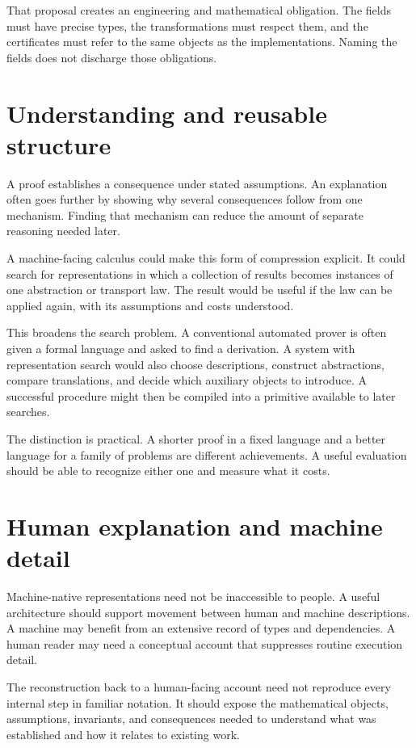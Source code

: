 \documentclass[11pt,oneside,openany]{book}
\begin{document}
That proposal creates an engineering and mathematical obligation. The fields must have precise types, the transformations must respect them, and the certificates must refer to the same objects as the implementations. Naming the fields does not discharge those obligations.

\section{Understanding and reusable structure}
A proof establishes a consequence under stated assumptions. An explanation often goes further by showing why several consequences follow from one mechanism. Finding that mechanism can reduce the amount of separate reasoning needed later.

A machine-facing calculus could make this form of compression explicit. It could search for representations in which a collection of results becomes instances of one abstraction or transport law. The result would be useful if the law can be applied again, with its assumptions and costs understood.

This broadens the search problem. A conventional automated prover is often given a formal language and asked to find a derivation. A system with representation search would also choose descriptions, construct abstractions, compare translations, and decide which auxiliary objects to introduce. A successful procedure might then be compiled into a primitive available to later searches.

The distinction is practical. A shorter proof in a fixed language and a better language for a family of problems are different achievements. A useful evaluation should be able to recognize either one and measure what it costs.

\section{Human explanation and machine detail}
Machine-native representations need not be inaccessible to people. A useful architecture should support movement between human and machine descriptions. A machine may benefit from an extensive record of types and dependencies. A human reader may need a conceptual account that suppresses routine execution detail.

The reconstruction back to a human-facing account need not reproduce every internal step in familiar notation. It should expose the mathematical objects, assumptions, invariants, and consequences needed to understand what was established and how it relates to existing work.
\end{document}
